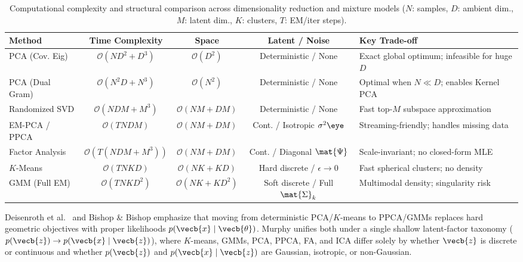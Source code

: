 \documentclass[../../../../master.tex]{subfiles}
\begin{document}
\begin{table}[htbp]
\centering
\caption{Computational complexity and structural comparison across dimensionality reduction and mixture models ($N$: samples, $D$: ambient dim., $M$: latent dim., $K$: clusters, $T$: EM/iter steps).}
\label{tab:em:complexity}
\small
\begin{tabularx}{\textwidth}{@{}lcccX@{}}
\toprule
\textbf{Method} & \textbf{Time Complexity} & \textbf{Space} & \textbf{Latent / Noise} & \textbf{Key Trade-off} \\
\midrule
PCA (Cov. Eig) & $\mathcal{O}(ND^2 + D^3)$ & $\mathcal{O}(D^2)$ & Deterministic / None & Exact global optimum; infeasible for huge $D$ \\
PCA (Dual Gram) & $\mathcal{O}(N^2 D + N^3)$ & $\mathcal{O}(N^2)$ & Deterministic / None & Optimal when $N \ll D$; enables Kernel PCA \\
Randomized SVD & $\mathcal{O}(NDM + M^3)$ & $\mathcal{O}(NM + DM)$ & Deterministic / None & Fast top-$M$ subspace approximation \\
EM-PCA / PPCA & $\mathcal{O}(T N D M)$ & $\mathcal{O}(NM + DM)$ & Cont. / Isotropic $\sigma^2\eye$ & Streaming-friendly; handles missing data \\
Factor Analysis & $\mathcal{O}(T(NDM + M^3))$ & $\mathcal{O}(NM + DM)$ & Cont. / Diagonal $\mat{\Psi}$ & Scale-invariant; no closed-form MLE \\
$K$-Means & $\mathcal{O}(T N K D)$ & $\mathcal{O}(NK + KD)$ & Hard discrete / $\epsilon{\to}0$ & Fast spherical clusters; no density \\
GMM (Full EM) & $\mathcal{O}(T N K D^2)$ & $\mathcal{O}(NK + KD^2)$ & Soft discrete / Full $\mat{\Sigma}_k$ & Multimodal density; singularity risk \\
\bottomrule
\end{tabularx}
\end{table}

\begin{crossbook}
Deisenroth et al.\  and Bishop \& Bishop  emphasize that moving from deterministic PCA/$K$-means to PPCA/GMMs replaces hard geometric objectives with proper likelihoods $p(\vecb{x} \mid \vecb{\theta})$. Murphy  unifies both under a single shallow latent-factor taxonomy ($p(\vecb{z}) \to p(\vecb{x}\mid\vecb{z})$), where $K$-means, GMMs, PCA, PPCA, FA, and ICA differ solely by whether $\vecb{z}$ is discrete or continuous and whether $p(\vecb{z})$ and $p(\vecb{x}\mid\vecb{z})$ are Gaussian, isotropic, or non-Gaussian.
\end{crossbook}
\end{document}
